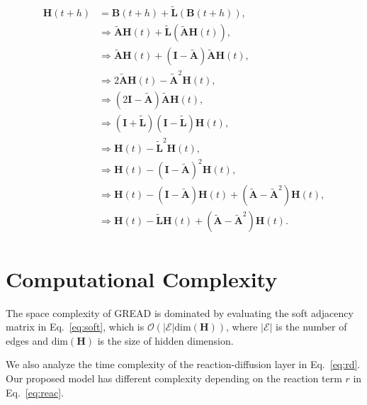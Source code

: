\documentclass{article}
\theoremstyle{plain}
\theoremstyle{definition}
\theoremstyle{remark}
\begin{document}
\begin{align*}\begin{split}
    \mathbf{H}(t+h) &= \mathbf{B}(t+h) + \tilde{\mathbf{L}}(\mathbf{B}(t+h)),\\
        &\Rightarrow \tilde{\mathbf{A}}\mathbf{H}(t) + \tilde{\mathbf{L}}(\tilde{\mathbf{A}}\mathbf{H}(t)),\\
            &\Rightarrow \tilde{\mathbf{A}}\mathbf{H}(t) + (\mathbf{I}-\tilde{\mathbf{A}})\tilde{\mathbf{A}}\mathbf{H}(t),\\
            &\Rightarrow 2\tilde{\mathbf{A}}\mathbf{H}(t) - \tilde{\mathbf{A}}^2\mathbf{H}(t),\\
            &\Rightarrow (2\mathbf{I}-\tilde{\mathbf{A}})\tilde{\mathbf{A}}\mathbf{H}(t),\\
            &\Rightarrow (\mathbf{I}+\tilde{\mathbf{L}})(\mathbf{I}-\tilde{\mathbf{L}})\mathbf{H}(t),\\
            &\Rightarrow \mathbf{H}(t) - \tilde{\mathbf{L}}^2\mathbf{H}(t),\\
            &\Rightarrow \mathbf{H}(t) - (\mathbf{I}-\tilde{\mathbf{A}})^2\mathbf{H}(t),\\
            &\Rightarrow \mathbf{H}(t) - (\mathbf{I}-\tilde{\mathbf{A}})\mathbf{H}(t) + (\tilde{\mathbf{A}}-\tilde{\mathbf{A}}^2)\mathbf{H}(t),\\
            &\Rightarrow \mathbf{H}(t) - \tilde{\mathbf{L}}\mathbf{H}(t) + (\tilde{\mathbf{A}}-\tilde{\mathbf{A}}^2)\mathbf{H}(t).
\end{split}\end{align*}

\section{Computational Complexity}\label{a:comp}
The space complexity of GREAD is dominated by evaluating the soft adjacency matrix in Eq.~\eqref{eq:soft}, which is $\mathcal{O}(|\mathcal{E}|\text{dim}(\mathbf{H}))$, where $|\mathcal{E}|$ is the number of edges and $\text{dim}(\mathbf{H})$ is the size of hidden dimension.

We also analyze the time complexity of the reaction-diffusion layer in Eq.~\eqref{eq:rd}. Our proposed model has different complexity depending on the reaction term $r$ in Eq.~\eqref{eq:reac}.
\end{document}
